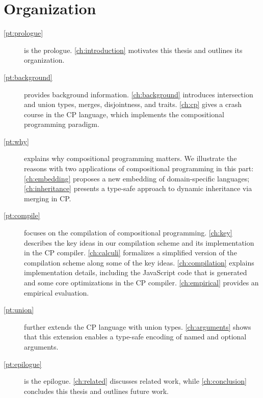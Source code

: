 \section{Organization}

\begin{description}
\item[\autoref{pt:prologue}] is the prologue. \autoref{ch:introduction}
      motivates this thesis and outlines its organization.
\item[\autoref{pt:background}] provides background information.
      \autoref{ch:background} introduces intersection and union types, merges,
      disjointness, and traits. \autoref{ch:cp} gives a crash course in the CP
      language, which implements the compositional programming paradigm.
\item[\autoref{pt:why}] explains why compositional programming matters. We
      illustrate the reasons with two applications of compositional programming
      in this part: \autoref{ch:embedding} proposes a new embedding of
      domain-specific languages; \autoref{ch:inheritance} presents a type-safe
      approach to dynamic inheritance via merging in CP.
\item[\autoref{pt:compile}] focuses on the compilation of compositional
      programming. \autoref{ch:key} describes the key ideas in our compilation
      scheme and its implementation in the CP compiler. \autoref{ch:calculi}
      formalizes a simplified version of the compilation scheme along some of
      the key ideas. \autoref{ch:compilation} explains implementation details,
      including the JavaScript code that is generated and some core
      optimizations in the CP compiler. \autoref{ch:empirical} provides an
      empirical evaluation.
\item[\autoref{pt:union}] further extends the CP language with union types.
      \autoref{ch:arguments} shows that this extension enables a type-safe
      encoding of named and optional arguments.
\item[\autoref{pt:epilogue}] is the epilogue. \autoref{ch:related} discusses
      related work, while \autoref{ch:conclusion} concludes this thesis and
      outlines future work.
\end{description}

\noindent\hrulefill

